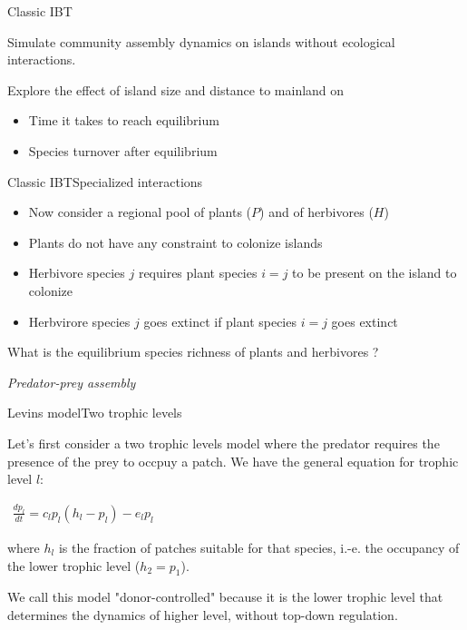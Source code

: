 \documentclass[10pt,aspectratio=149]{beamer}
\newcommand{\keyeqs}[1]{%
  \begin{center}
    \normalsize$\displaystyle
    \begin{aligned}
    #1
    \end{aligned}
    $
  \end{center}%
}
\begin{document}

\begin{frame}{Classic IBT}

    Simulate community assembly dynamics on islands without ecological interactions. 
    
    Explore the effect of island size and distance to mainland on 

    \begin{itemize}
        \item Time it takes to reach equilibrium
        \item Species turnover after equilibrium 
    \end{itemize}

\end{frame}


\begin{frame}{Classic IBT}{Specialized interactions}

    \begin{itemize}
        \item Now consider a regional pool of plants ($P$) and of herbivores ($H$)
        \item Plants do not have any constraint to colonize islands       
        \item Herbivore species $j$ requires plant species $i=j$ to be present on the island to colonize
        \item Herbvirore species $j$ goes extinct if plant species $i=j$ goes extinct
    \end{itemize}

    What is the equilibrium species richness of plants and herbivores ?

\end{frame}


{
\usebackgroundtemplate{}
\begin{frame}

	\pagecolor{BDQC1st}
	\color{white}

	\LARGE{\textit{Predator-prey assembly}}

\end{frame}
}


\begin{frame}{Levins model}{Two trophic levels}

    Let's first consider a two trophic levels model where the predator requires the presence of the prey to occpuy a patch. We have the general equation for trophic level $l$:

    \keyeqs{\frac{dp_l}{dt} = c_lp_l(h_l-p_l) - e_lp_l}

    where $h_l$ is the fraction of patches suitable for that species, i.-e. the occupancy of the lower trophic level ($h_2 = p_1$).

    We call this model "donor-controlled" because it is the lower trophic level that determines the dynamics of higher level, without top-down regulation. 
\end{frame}
\end{document}
